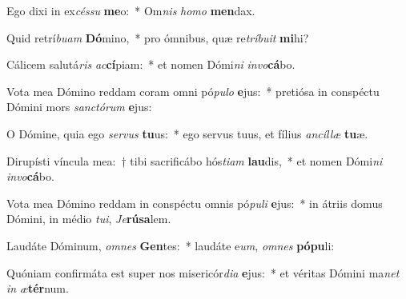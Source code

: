 \item Ego dixi in ex\textit{cés}\textit{su} \textbf{me}o:~* Om\textit{nis} \textit{ho}\textit{mo} \textbf{men}dax.
\item Quid retrí\textit{bu}\textit{am} \textbf{Dó}mino,~* pro ómnibus, quæ re\textit{trí}\textit{bu}\textit{it} \textbf{mi}hi?
\item Cálicem salutá\textit{ris} \textit{ac}\textbf{cí}piam:~* et nomen Dómi\textit{ni} \textit{in}\textit{vo}\textbf{cá}bo.
\item Vota mea Dómino reddam coram omni pó\textit{pu}\textit{lo} \textbf{e}jus:~* pretiósa in conspéctu Dómini mors \textit{sanc}\textit{tó}\textit{rum} \textbf{e}jus:
\item O Dómine, quia ego \textit{ser}\textit{vus} \textbf{tu}us:~* ego servus tuus, et fílius \textit{an}\textit{cíl}\textit{læ} \textbf{tu}æ.
\item Dirupísti víncula mea:~† tibi sacrificábo hós\textit{ti}\textit{am} \textbf{lau}dis,~* et nomen Dómi\textit{ni} \textit{in}\textit{vo}\textbf{cá}bo.
\item Vota mea Dómino reddam in conspéctu omnis pó\textit{pu}\textit{li} \textbf{e}jus:~* in átriis domus Dómini, in médio \textit{tu}\textit{i}, \textit{Je}\textbf{rú}\textbf{sa}lem.
\item Laudáte Dóminum, \textit{om}\textit{nes} \textbf{Gen}tes:~* laudáte e\textit{um}, \textit{om}\textit{nes} \textbf{pó}\textbf{pu}li:
\item Quóniam confirmáta est super nos misericór\textit{di}\textit{a} \textbf{e}jus:~* et véritas Dómini ma\textit{net} \textit{in} \textit{æ}\textbf{tér}num.
